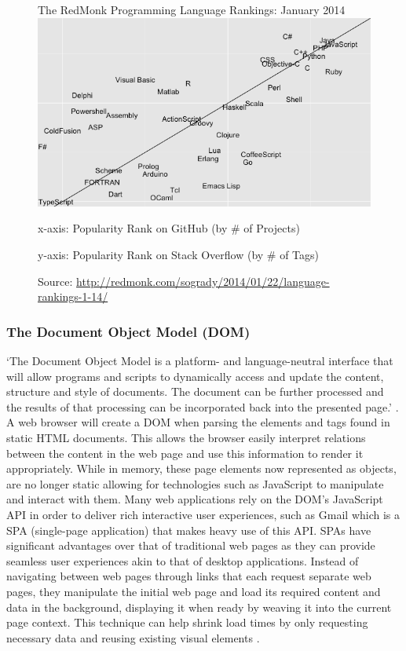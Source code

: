 \documentclass[final]{cmpreport}
\begin{document}

\begin{figure}[h!]{The RedMonk Programming Language Rankings: January 2014 \label{ranking}}
  \includegraphics[width=1.0\textwidth]{lang-rank-114-wm.png}
  \begin{tablenotes}
    \item x-axis: Popularity Rank on GitHub (by \# of Projects)
    \item y-axis: Popularity Rank on Stack Overflow (by \# of Tags)
    \item Source: \url{http://redmonk.com/sogrady/2014/01/22/language-rankings-1-14/}
  \end{tablenotes}
\end{figure}

\subsubsection{The Document Object Model (DOM)}
`The Document Object Model is a platform- and language-neutral interface that will allow programs and scripts to dynamically access and update the content, structure and style of documents. The document can be further processed and the results of that processing can be incorporated back into the presented page.' \citep{W3C3}. A web browser will create a DOM when parsing the elements and tags found in static HTML documents. This allows the browser easily interpret relations between the content in the web page and use this information to render it appropriately. While in memory, these page elements now represented as objects, are no longer static allowing for technologies such as JavaScript to manipulate and interact with them. Many web applications rely on the DOM's JavaScript API in order to deliver rich interactive user experiences, such as Gmail which is a SPA (single-page application) that makes heavy use of this API. SPAs have significant advantages over that of traditional web pages as they can provide seamless user experiences akin to that of desktop applications. Instead of navigating between web pages through links that each request separate web pages, they manipulate the initial web page and load its required content and data in the background, displaying it when ready by weaving it into the current page context. This technique can help shrink load times by only requesting necessary data and reusing existing visual elements \citep{Takada}.
\end{document}
